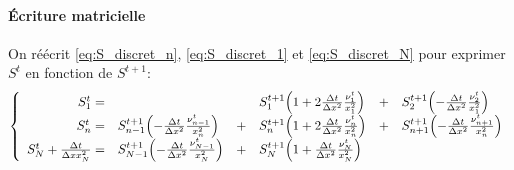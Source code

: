 \paragraph{Écriture matricielle}
On réécrit \eqref{eq:S_discret_n}, \eqref{eq:S_discret_1} et \eqref{eq:S_discret_N} pour exprimer $S^t$ en fonction de $S^{t+1}$:
\begin{equation}
  \left\lbrace\begin{array}{r l c l c l }
    S^{t}_1 = &
               & &S_1^{t+1}\left(1 + 2\frac{\Delta t}{\Delta x^2}\frac{\nu_1^t}{x_1^2}\right)
               &+& S_{2}^{t+1}\left(-\frac{\Delta t}{\Delta x^2}\frac{\nu_{2}^t}{x_1^2}\right)\\
    S^{t}_n = &S_{n-1}^{t+1}\left(-\frac{\Delta t}{\Delta x^2}\frac{\nu_{n-1}^t}{x_n^2}\right)
               &+& S_n^{t+1}\left(1 + 2\frac{\Delta t}{\Delta x^2}\frac{\nu_n^t}{x_n^2}\right)
               &+& S_{n+1}^{t+1}\left(-\frac{\Delta t}{\Delta x^2}\frac{\nu_{n+1}^t}{x_n^2}\right)\\
    S^{t}_N + \frac{\Delta t}{\Delta x x_N^2} =
               &S^{t+1}_{N-1} \left(-\frac{\Delta t}{\Delta x^2}\frac{\nu_{N-1}^t}{x_N^2}\right)
               &+& S_N^{t+1} \left(1 + \frac{\Delta t}{\Delta x^2}\frac{\nu^t_N}{x_N^2}\right)
               & &
  \end{array}\right.
\end{equation}

